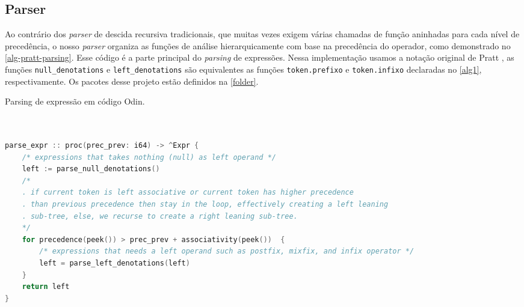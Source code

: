 \subsection{Parser}


Ao contrário dos \textit{parser} de descida recursiva tradicionais, que muitas vezes exigem várias chamadas de função aninhadas para cada nível de precedência, o nosso \textit{parser} organiza as funções de análise hierarquicamente com base na precedência do operador, como demonstrado no \autoref{alg-pratt-parsing}. Esse código é a parte principal do \textit{parsing} de expressões. Nessa implementação usamos a notação original de Pratt \cite{pratt}, as funções \texttt{null\_denotations} e \texttt{left\_denotations} são equivalentes as funções \texttt{token.prefixo} e \texttt{token.infixo} declaradas no \autoref{alg1}, respectivamente. Os pacotes desse projeto estão definidos na \autoref{folder}.




\begin{codigo}[H]
  \caption{\small Parsing de expressão em código Odin.}
        \label{alg-pratt-parsing}
  \begin{lstlisting}[language=C]


parse_expr :: proc(prec_prev: i64) -> ^Expr {
    /* expressions that takes nothing (null) as left operand */
    left := parse_null_denotations() 
    /*
    . if current token is left associative or current token has higher precedence
    . than previous precedence then stay in the loop, effectively creating a left leaning
    . sub-tree, else, we recurse to create a right leaning sub-tree.
    */
    for precedence(peek()) > prec_prev + associativity(peek())  {
        /* expressions that needs a left operand such as postfix, mixfix, and infix operator */
        left = parse_left_denotations(left)
    }
    return left
}


  \end{lstlisting}
\end{codigo}


